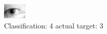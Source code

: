 \begin{figure}[h!]
\begin{center}
\includegraphics[width=0.60\columnwidth]{figures/ID1250_class_4_target_3.png}
\end{center}
\caption{ Classification: 4 actual target: 3}
\label{fig:ID1250_class_4_target_3}
\end{figure}
